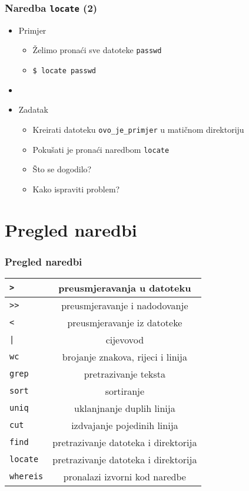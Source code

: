 \documentclass{beamer}
\newcommand{\shell}[1]{\texttt{#1}}
\begin{document}
\begin{frame}[t]
\frametitle{Naredba \shell{locate} (2)}
\begin{itemize}
  \item Primjer
  \begin{itemize}
    \item Želimo pronaći sve datoteke \shell{passwd}
    \item[] \shell{\$ locate passwd}
  \end{itemize}
  \item[]
  \item Zadatak
  \begin{itemize}
      \item Kreirati datoteku \shell{ovo\_je\_primjer} u matičnom direktoriju
	  \item Pokušati je pronaći naredbom \shell{locate}
	  \item Što se dogodilo?
	  \item Kako ispraviti problem?
  \end{itemize}
\end{itemize}
\end{frame}


\section{Pregled naredbi}

\begin{frame}[t]
\frametitle{Pregled naredbi}
\begin{tabular}{| l | c |} \hline
  \shell{>} & preusmjeravanja u datoteku \\ \hline
  \shell{>>} &  preusmjeravanje i nadodovanje\\ \hline
  \shell{<} & preusmjeravanje iz datoteke \\ \hline
  \shell{|} & cijevovod \\ \hline
  \shell{wc} & brojanje znakova, rijeci i linija \\ \hline
  \shell{grep} & pretrazivanje teksta \\ \hline
  \shell{sort} & sortiranje \\ \hline
  \shell{uniq} & uklanjnanje duplih linija \\ \hline
  \shell{cut} & izdvajanje pojedinih linija \\ \hline
  \shell{find} & pretrazivanje datoteka i direktorija \\ \hline
  \shell{locate} & pretrazivanje datoteka i direktorija \\ \hline
  \shell{whereis} & pronalazi izvorni kod naredbe \\ \hline


\end{tabular}
\end{frame}
\end{document}
